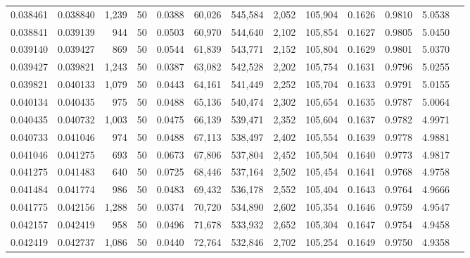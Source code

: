 \begin{tabular}{rrrrrrrrrrrrr}
0.038461 & 0.038840 & 1,239 &  50 &                                     0.0388 &  60,026 & 545,584 &   2,052 & 105,904 & 0.1626 & 0.9810 & 5.0538 \\
0.038841 & 0.039139 &   944 &  50 &                                     0.0503 &  60,970 & 544,640 &   2,102 & 105,854 & 0.1627 & 0.9805 & 5.0450 \\
0.039140 & 0.039427 &   869 &  50 &                                     0.0544 &  61,839 & 543,771 &   2,152 & 105,804 & 0.1629 & 0.9801 & 5.0370 \\
0.039427 & 0.039821 & 1,243 &  50 &                                     0.0387 &  63,082 & 542,528 &   2,202 & 105,754 & 0.1631 & 0.9796 & 5.0255 \\
0.039821 & 0.040133 & 1,079 &  50 &                                     0.0443 &  64,161 & 541,449 &   2,252 & 105,704 & 0.1633 & 0.9791 & 5.0155 \\
0.040134 & 0.040435 &   975 &  50 &                                     0.0488 &  65,136 & 540,474 &   2,302 & 105,654 & 0.1635 & 0.9787 & 5.0064 \\
0.040435 & 0.040732 & 1,003 &  50 &                                     0.0475 &  66,139 & 539,471 &   2,352 & 105,604 & 0.1637 & 0.9782 & 4.9971 \\
0.040733 & 0.041046 &   974 &  50 &                                     0.0488 &  67,113 & 538,497 &   2,402 & 105,554 & 0.1639 & 0.9778 & 4.9881 \\
0.041046 & 0.041275 &   693 &  50 &                                     0.0673 &  67,806 & 537,804 &   2,452 & 105,504 & 0.1640 & 0.9773 & 4.9817 \\
0.041275 & 0.041483 &   640 &  50 &                                     0.0725 &  68,446 & 537,164 &   2,502 & 105,454 & 0.1641 & 0.9768 & 4.9758 \\
0.041484 & 0.041774 &   986 &  50 &                                     0.0483 &  69,432 & 536,178 &   2,552 & 105,404 & 0.1643 & 0.9764 & 4.9666 \\
0.041775 & 0.042156 & 1,288 &  50 &                                     0.0374 &  70,720 & 534,890 &   2,602 & 105,354 & 0.1646 & 0.9759 & 4.9547 \\
0.042157 & 0.042419 &   958 &  50 &                                     0.0496 &  71,678 & 533,932 &   2,652 & 105,304 & 0.1647 & 0.9754 & 4.9458 \\
0.042419 & 0.042737 & 1,086 &  50 &                                     0.0440 &  72,764 & 532,846 &   2,702 & 105,254 & 0.1649 & 0.9750 & 4.9358 \\

\end{tabular}
